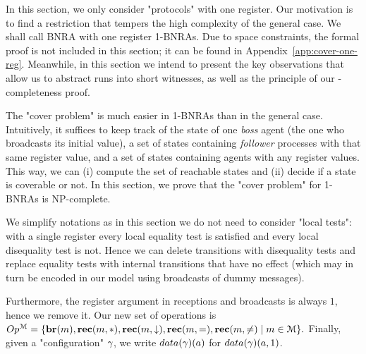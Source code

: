 	In this section, we only consider "protocols" with one register. Our motivation is to find a restriction that tempers the high complexity of the general case. We shall call BNRA with one register 1-BNRAs. Due to space constraints, the formal proof is not included in this section; it can be found in Appendix~\ref{app:cover-one-reg}. Meanwhile, in this section we intend to present the key observations that allow us to abstract runs into short witnesses, as well as the principle of our \NP-completeness proof.
	
	The "cover problem" is much easier in 1-BNRAs than in the general case. Intuitively, it suffices to keep track of the state of one \emph{boss} agent (the one who broadcasts its initial value), a set of states containing \emph{follower} processes with that same register value, and a set of states containing agents with any register values. This way, we can (i) compute the set of reachable states and (ii) decide if a state is coverable or not. In this section, we prove that the "cover problem" for 1-BNRAs is NP-complete.

	We simplify notations as in this section we do not need to consider "local tests": with a single register every local equality test is satisfied and every local disequality test is not.
	Hence we can delete transitions with disequality tests and replace equality tests with internal transitions that have no effect (which may in turn be encoded in our model using broadcasts of dummy messages). 
	 
	Furthermore, the register argument in receptions and broadcasts is always $1$, hence we remove it.
	Our new set of operations is 
	$
	Op^{\mathcal{M}} = \{\textbf{br}(m), \textbf{rec}(m, {*}), \textbf{rec}(m, \downarrow), \textbf{rec}(m, {=}), \textbf{rec}(m, {\ne}) \mid m \in \mathcal{M}\}.
	$
	Finally, given a "configuration" $\gamma$, we write $\data{\config}(a)$ for $\data{\config}(a,1)$. 

		



